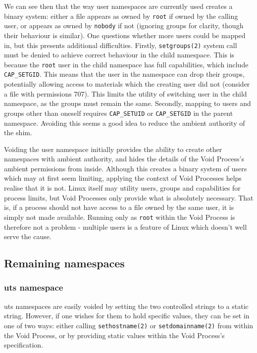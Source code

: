 \documentclass[sigplan]{acmart}
\begin{document}
We can see then that the way user namespaces are currently used creates a binary system: either a file appears as owned by \texttt{root} if owned by the calling user, or appears as owned by \texttt{nobody} if not (ignoring groups for clarity, though their behaviour is similar). One questions whether more users could be mapped in, but this presents additional difficulties. Firstly, \texttt{setgroups(2)} system call must be denied to achieve correct behaviour in the child namespace. This is because the \texttt{root} user in the child namespace has full capabilities, which include \texttt{CAP\_SETGID}. This means that the user in the namespace can drop their groups, potentially allowing access to materials which the creating user did not (consider a file with permissions 707). This limits the utility of switching user in the child namespace, as the groups must remain the same. Secondly, mapping to users and groups other than oneself requires \texttt{CAP\_SETUID} or \texttt{CAP\_SETGID} in the parent namespace. Avoiding this seems a good idea to reduce the ambient authority of the shim.

Voiding the user namespace initially provides the ability to create other namespaces with ambient authority, and hides the details of the Void Process's ambient permissions from inside. Although this creates a binary system of users which may at first seem limiting, applying the context of Void Processes helps realise that it is not. Linux itself may utility users, groups and capabilities for process limits, but Void Processes only provide what is absolutely necessary. That is, if a process should not have access to a file owned by the same user, it is simply not made available. Running only as \texttt{root} within the Void Process is therefore not a problem - multiple users is a feature of Linux which doesn't well serve the cause.

\subsection{Remaining namespaces}

\subsubsection{uts namespace}
\label{sec:filling-uts}

uts namespaces are easily voided by setting the two controlled strings to a static string. However, if one wishes for them to hold specific values, they can be set in one of two ways: either calling \texttt{sethostname(2)} or \texttt{setdomainname(2)} from within the Void Process, or by providing static values within the Void Process's specification.
\end{document}
